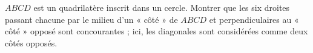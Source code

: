 $ABCD$ est un quadrilatère inscrit dans un cercle. Montrer que les six droites passant chacune par le milieu d'un « côté » de $ABCD$ et perpendiculaires au « côté » opposé sont concourantes ; ici, les diagonales sont considérées comme deux côtés opposés.

